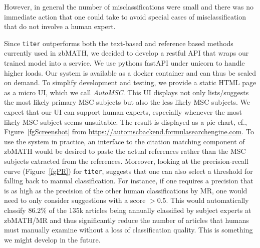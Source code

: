 However, in general the number of misclassifications were small and there was no immediate action that one could take to avoid special cases of misclassification that do not involve a human expert.

Since \texttt{titer} outperforms both the text-based and reference based methods currently used in zbMATH, we decided to develop a restful API that wraps our trained model into a service.
We use pythons fastAPI under unicorn to handle higher loads.
Our system is available as a docker container and can thus be scaled on demand.
To simplify development and testing, we provide a static HTML page as a micro UI, which we call \emph{AutoMSC}.
This UI displays not only lists/suggests the most likely primary MSC subjects but also the less likely MSC subjects.
We expect that our UI can support human experts, especially whenever the most likely MSC subject seems unsuitable.
The result is displayed as a pie-chart, cf., Figure~\ref{fgScreenshot} from \url{https://automscbackend.formulasearchengine.com}.
To use the system in practice, an interface to the citation matching component of zbMATH would be desired to paste the actual references rather than the MSC subjects extracted from the references.
Moreover, looking at the precision-recall curve (Figure~\ref{fgPR}) for \texttt{titer}, suggests that one can also select a threshold for falling back to manual classification.
For instance, if one requires a precision that is as high as the precision of the other human classifications by MR, one would need to only consider suggestions with a score \(> 0.5\).
This would automatically classify \(86.2\%\) of the 135k articles being annually classified by subject experts at zbMATH/MR and thus significantly reduce the number of articles that humans must manually examine without a loss of classification quality.
This is something we might develop in the future.


